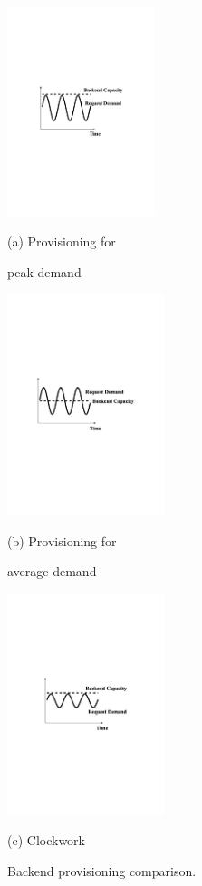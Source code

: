 \begin{figure}[t]
	\centering
	\hspace{-0.4cm}
	\begin{minipage}[t]{1.7in}
		\centering
		\includegraphics[trim=45mm 110mm 45mm 110mm, clip,width=1.7in]{figs/intro1}\\
		\centerline{(a) Provisioning for}
		\centerline{peak demand}
	\end{minipage}
	\hspace{-0.1cm}
	\begin{minipage}[t]{1.8in}
		\centering
		\includegraphics[trim=40mm 110mm 40mm 110mm, clip,width=1.8in]{figs/intro2}\\
		\centerline{(b) Provisioning for}
		\centerline{average demand}
	\end{minipage}
	\hspace{-0.cm}
	\begin{minipage}[t]{1.8in}
		\centering
	\includegraphics[trim=50mm 110mm 45mm 110mm, clip,width=1.8in]{figs/intro3}\\
		\centerline{(c) Clockwork}
	\end{minipage}
	\caption{Backend provisioning comparison.} \label{fig:intro}
\end{figure}

